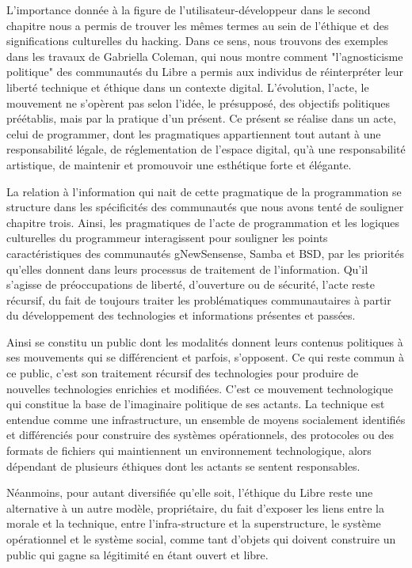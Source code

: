 L'importance donnée à la figure de l'utilisateur-développeur dans le second chapitre nous a permis de trouver les mêmes termes au sein de l'éthique et des significations culturelles du hacking. Dans ce sens, nous trouvons des exemples dans les travaux de Gabriella Coleman, qui nous montre comment "l'agnosticisme politique" des communautés du Libre a permis aux individus de réinterpréter leur liberté technique et éthique dans un contexte digital. L'évolution, l'acte, le mouvement ne s'opèrent pas selon l'idée, le présupposé, des objectifs politiques préétablis, mais par la pratique d'un présent. Ce présent se réalise dans un acte, celui de programmer, dont les pragmatiques appartiennent tout autant à une responsabilité légale, de réglementation de l'espace digital, qu'à une responsabilité artistique, de maintenir et promouvoir une esthétique forte et élégante.

La relation à l'information qui nait de cette pragmatique de la programmation se structure  dans les spécificités des communautés que nous avons tenté de souligner chapitre trois. Ainsi, les pragmatiques de l'acte de programmation et les logiques culturelles du programmeur interagissent pour souligner les points caractéristiques des communautés gNewSensense, Samba et BSD, par les priorités qu'elles donnent dans leurs processus de traitement de l'information. Qu'il s'agisse de préoccupations de liberté, d'ouverture ou de sécurité, l'acte reste récursif, du fait de toujours traiter les problématiques communautaires à partir du développement des technologies et informations présentes et passées.

Ainsi se constitu un public dont les modalités donnent leurs contenus politiques à ses mouvements qui se différencient et parfois, s'opposent. Ce qui reste commun à ce public, c'est son traitement récursif des technologies pour produire de nouvelles technologies enrichies et modifiées. C'est ce mouvement technologique qui constitue la base de l'imaginaire politique de ses actants. La technique est entendue comme une infrastructure, un ensemble de moyens socialement identifiés et différenciés pour construire des systèmes opérationnels, des protocoles ou des formats de fichiers qui maintiennent un environnement technologique, alors dépendant de plusieurs éthiques dont les actants se sentent responsables.

Néanmoins, pour autant diversifiée qu'elle soit, l'éthique du Libre reste une alternative à un autre modèle, propriétaire, du fait d'exposer les liens entre la morale et la technique, entre l'infra-structure et la superstructure, le système opérationnel et le système social, comme tant d'objets qui doivent construire un public qui gagne sa légitimité en étant ouvert et libre.
